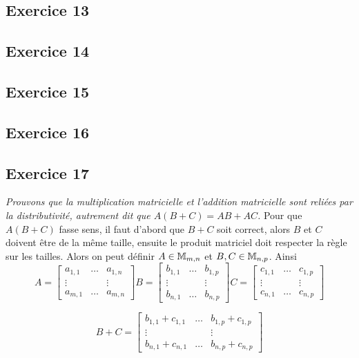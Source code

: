 \documentclass[12pt]{book}
\begin{document}
\subsection*{Exercice 13}


\subsection*{Exercice 14}


\subsection*{Exercice 15}


\subsection*{Exercice 16}


\subsection*{Exercice 17}
\textit{Prouvons que la multiplication matricielle et l'addition matricielle sont reliées par la distributivité, autrement dit que $A(B+C)=AB+AC$.} 
Pour que $A(B+C)$ fasse sens, il faut d'abord que $B+C$ soit correct, alors $B$ et $C$ doivent être de la même taille, ensuite le produit matriciel doit respecter la règle sur les tailles. Alors on peut définir $A\in\mathbb{M}_{m,n}$ et $B,C\in\mathbb{M}_{n,p}$.
Ainsi 
\begin{equation*}
    A = 
    \begin{bmatrix}
    a_{1,1} & \ldots & a_{1,n} \\
    \vdots & & \vdots \\
    a_{m,1} & \ldots & a_{m,n}
    \end{bmatrix}
    B = 
    \begin{bmatrix}
    b_{1,1} & \ldots & b_{1,p} \\
    \vdots & & \vdots \\
    b_{n,1} & \ldots & b_{n,p}
    \end{bmatrix}
    C = 
    \begin{bmatrix}
    c_{1,1} & \ldots & c_{1,p} \\
    \vdots & & \vdots \\
    c_{n,1} & \ldots & c_{n,p}
    \end{bmatrix}
\end{equation*}

\begin{equation*}
    B+C = 
    \begin{bmatrix}
    b_{1,1} + c_{1,1} & \ldots & b_{1,p} + c_{1,p} \\
    \vdots & & \vdots \\
    b_{n,1} + c_{n,1} & \ldots & b_{n,p}+c_{n,p}
    \end{bmatrix}
\end{equation*}
\end{document}
